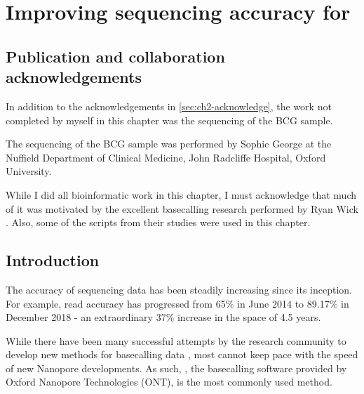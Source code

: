 \chapter{Improving \ont{} sequencing accuracy for \mtb{}}
\label{chap:tubby}

\setcounter{section}{-1}
\section{Publication and collaboration acknowledgements}
\label{sec:ch4-acknowledge}

In addition to the acknowledgements in \autoref{sec:ch2-acknowledge}, the work not completed by myself in this chapter was the sequencing of the BCG sample.

The \ont{} sequencing of the BCG sample was performed by Sophie George at the Nuffield Department of Clinical Medicine, John Radcliffe Hospital, Oxford University.

While I did all bioinformatic work in this chapter, I must acknowledge that much of it was motivated by the excellent \ont{} basecalling research performed by Ryan Wick \etal{} \cite{wick2019,wick2020}. Also, some of the scripts from their studies were used in this chapter.

\section{Introduction}
The accuracy of \ont{} sequencing data has been steadily increasing since its inception. For example, read accuracy has progressed from 65\% in June 2014 \cite{Loman2015} to 89.17\% in December 2018 \cite{wick2019} - an extraordinary 37\% increase in the space of 4.5 years. 

While there have been many successful attempts by the research community to develop new methods for basecalling \ont{} data \cite{chiron2018,Stoiber2017,Boza2020}, most cannot keep pace with the speed of new Nanopore developments. As such, \guppy{}, the basecalling software provided by Oxford Nanopore Technologies (ONT), is the most commonly used method.

